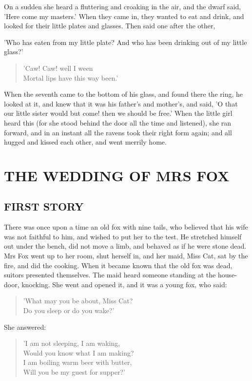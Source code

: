 \documentclass[12pt]{book}
\begin{document}
On a sudden she heard a fluttering and croaking in the air, and the
dwarf said, 'Here come my masters.' When they came in, they wanted to
eat and drink, and looked for their little plates and glasses. Then
said one after the other,

'Who has eaten from my little plate? And who has been drinking out of
my little glass?'

\begin{verse}
 'Caw! Caw! well I ween\\
  Mortal lips have this way been.'
\end{verse}

When the seventh came to the bottom of his glass, and found there the
ring, he looked at it, and knew that it was his father's and mother's,
and said, 'O that our little sister would but come! then we should be
free.' When the little girl heard this (for she stood behind the door
all the time and listened), she ran forward, and in an instant all the
ravens took their right form again; and all hugged and kissed each
other, and went merrily home.



\chapter{THE WEDDING OF MRS FOX}


\section{FIRST STORY}

There was once upon a time an old fox with nine tails, who believed
that his wife was not faithful to him, and wished to put her to the
test. He stretched himself out under the bench, did not move a limb,
and behaved as if he were stone dead. Mrs Fox went up to her room,
shut herself in, and her maid, Miss Cat, sat by the fire, and did the
cooking. When it became known that the old fox was dead, suitors
presented themselves. The maid heard someone standing at the house-
door, knocking. She went and opened it, and it was a young fox, who
said:

\begin{verse}
 'What may you be about, Miss Cat?\\
  Do you sleep or do you wake?'
\end{verse}

She answered:

\begin{verse}
 'I am not sleeping, I am waking,\\
  Would you know what I am making?\\
  I am boiling warm beer with butter,\\
  Will you be my guest for supper?'
\end{verse}
\end{document}
